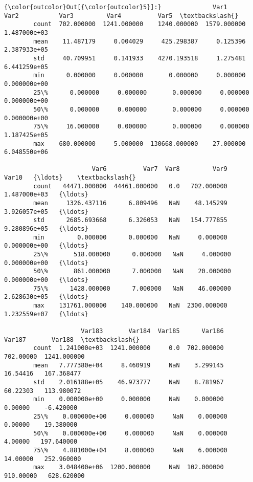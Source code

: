 \documentclass[11pt]{article}
\begin{document}
\begin{Verbatim}[commandchars=\\\{\}]
{\color{outcolor}Out[{\color{outcolor}5}]:}              Var1         Var2           Var3         Var4          Var5  \textbackslash{}
        count  702.000000  1241.000000    1240.000000  1579.000000  1.487000e+03   
        mean    11.487179     0.004029     425.298387     0.125396  2.387933e+05   
        std     40.709951     0.141933    4270.193518     1.275481  6.441259e+05   
        min      0.000000     0.000000       0.000000     0.000000  0.000000e+00   
        25\%      0.000000     0.000000       0.000000     0.000000  0.000000e+00   
        50\%      0.000000     0.000000       0.000000     0.000000  0.000000e+00   
        75\%     16.000000     0.000000       0.000000     0.000000  1.187425e+05   
        max    680.000000     5.000000  130668.000000    27.000000  6.048550e+06   
        
                        Var6          Var7  Var8         Var9         Var10   {\ldots}    \textbackslash{}
        count   44471.000000  44461.000000   0.0   702.000000  1.487000e+03   {\ldots}     
        mean     1326.437116      6.809496   NaN    48.145299  3.926057e+05   {\ldots}     
        std      2685.693668      6.326053   NaN   154.777855  9.280896e+05   {\ldots}     
        min         0.000000      0.000000   NaN     0.000000  0.000000e+00   {\ldots}     
        25\%       518.000000      0.000000   NaN     4.000000  0.000000e+00   {\ldots}     
        50\%       861.000000      7.000000   NaN    20.000000  0.000000e+00   {\ldots}     
        75\%      1428.000000      7.000000   NaN    46.000000  2.628630e+05   {\ldots}     
        max    131761.000000    140.000000   NaN  2300.000000  1.232559e+07   {\ldots}     
        
                     Var183       Var184  Var185      Var186     Var187       Var188  \textbackslash{}
        count  1.241000e+03  1241.000000     0.0  702.000000  702.00000  1241.000000   
        mean   7.777380e+04     8.460919     NaN    3.299145   16.54416   167.368477   
        std    2.016188e+05    46.973777     NaN    8.781967   60.22303   113.980072   
        min    0.000000e+00     0.000000     NaN    0.000000    0.00000    -6.420000   
        25\%    0.000000e+00     0.000000     NaN    0.000000    0.00000    19.380000   
        50\%    0.000000e+00     0.000000     NaN    0.000000    4.00000   197.640000   
        75\%    4.881000e+04     8.000000     NaN    6.000000   14.00000   252.960000   
        max    3.048400e+06  1200.000000     NaN  102.000000  910.00000   628.620000   
        

\end{Verbatim}
\end{document}
